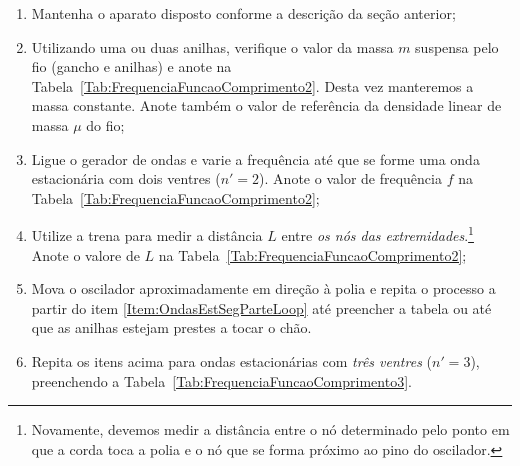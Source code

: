 \begin{enumerate}
\item Mantenha o aparato disposto conforme a descrição da seção anterior;
\item Utilizando uma ou duas anilhas, verifique o valor da massa $m$ suspensa pelo fio (gancho e anilhas) e anote na Tabela~\ref{Tab:FrequenciaFuncaoComprimento2}. Desta vez manteremos a massa constante. Anote também o valor de referência da densidade linear de massa $\mu$ do fio;
\item Ligue o gerador de ondas e varie a frequência até que se forme uma onda estacionária com dois ventres ($n' = 2$). Anote o valor de frequência $f$ na Tabela~\ref{Tab:FrequenciaFuncaoComprimento2};\label{Item:OndasEstSegParteLoop}
\item Utilize a trena para medir a distância $L$ entre \emph{os nós das extremidades}.\footnote{Novamente, devemos medir a distância entre o nó determinado pelo ponto em que a corda toca a polia e o nó que se forma próximo ao pino do oscilador.} Anote o valore de $L$ na Tabela~\ref{Tab:FrequenciaFuncaoComprimento2};
\item Mova o oscilador aproximadamente  em direção à polia e repita o processo a partir do item \ref{Item:OndasEstSegParteLoop} até preencher a tabela ou até que as anilhas estejam prestes a tocar o chão.
\item Repita os itens acima para ondas estacionárias com \emph{três ventres} ($n' = 3$), preenchendo a Tabela~\ref{Tab:FrequenciaFuncaoComprimento3}.
\end{enumerate}

\cleardoublepage


\vspace{15mm}

\begin{fullwidth}
\noindent{}
\vspace{5mm}

\noindent{}

\noindent{}

\noindent{}

\noindent{}

\noindent{}
\end{fullwidth}

